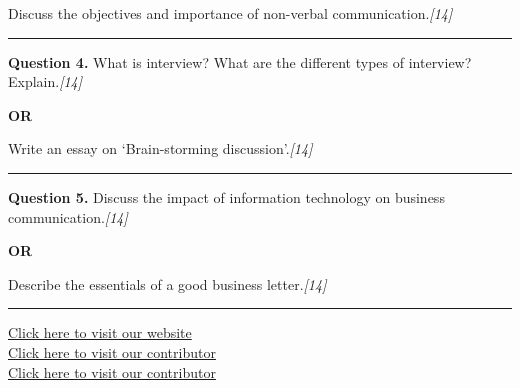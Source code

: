 \documentclass[11pt,a4paper]{article}
\newcommand{\pts}[1]{\hfill   \textit{[#1]}}
\begin{document}
Discuss the objectives and importance of non-verbal communication.\pts{14}

\medskip\rule{\linewidth}{0.2pt}




\noindent   \textbf{Question 4.}
What is interview? What are the different types of interview? Explain.\pts{14}

\centerline{   \textbf{OR}}

Write an essay on `Brain-storming discussion'.\pts{14}

\medskip\rule{\linewidth}{0.2pt}




\noindent   \textbf{Question 5.}
Discuss the impact of information technology on business communication.\pts{14}

\centerline{   \textbf{OR}}

Describe the essentials of a good business letter.\pts{14}

\vfill
\rule{\linewidth}{0.4pt}

\begin{center}\small
\href{https://bhu-exam.vercel.app/}{Click here to visit our website}\\[4pt]
\href{https://me-aryan.vercel.app/}{Click here to visit our contributor}\\[4pt]
\href{https://quashan-me.vercel.app/}{Click here to visit our contributor}
\end{center}
\end{document}
